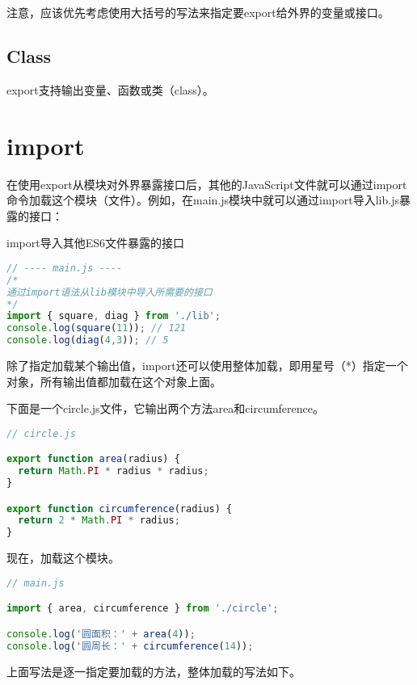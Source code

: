 注意，应该优先考虑使用大括号的写法来指定要export给外界的变量或接口。

\subsection{Class}

export支持输出变量、函数或类（class）。




\section{import}

在使用export从模块对外界暴露接口后，其他的JavaScript文件就可以通过import命令加载这个模块（文件）。例如，在main.js模块中就可以通过import导入lib.js暴露的接口：


\begin{example}
import导入其他ES6文件暴露的接口
\begin{lstlisting}[language=JavaScript]
// ---- main.js ----
/* 
通过import语法从lib模块中导入所需要的接口
*/
import { square, diag } from './lib';
console.log(square(11)); // 121
console.log(diag(4,3)); // 5
\end{lstlisting}
\end{example}

除了指定加载某个输出值，import还可以使用整体加载，即用星号（*）指定一个对象，所有输出值都加载在这个对象上面。


下面是一个circle.js文件，它输出两个方法area和circumference。

\begin{lstlisting}[language=JavaScript]
// circle.js

export function area(radius) {
  return Math.PI * radius * radius;
}

export function circumference(radius) {
  return 2 * Math.PI * radius;
}
\end{lstlisting}


现在，加载这个模块。

\begin{lstlisting}[language=JavaScript]
// main.js

import { area, circumference } from './circle';

console.log('圆面积：' + area(4));
console.log('圆周长：' + circumference(14));
\end{lstlisting}

上面写法是逐一指定要加载的方法，整体加载的写法如下。





